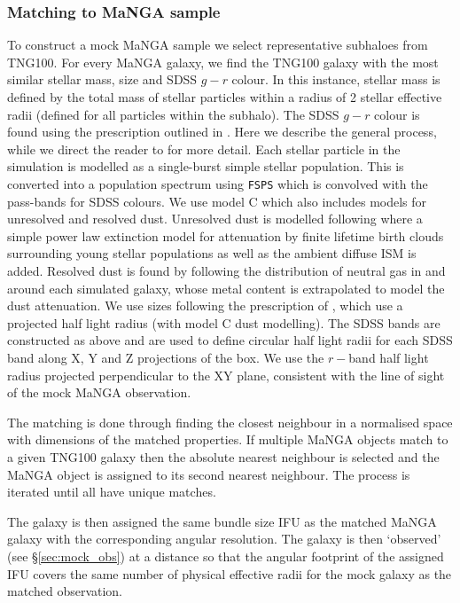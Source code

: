 \subsubsection{Matching to MaNGA sample}
To construct a mock MaNGA sample we select representative subhaloes from TNG100. For every MaNGA galaxy, we find the TNG100 galaxy with the most similar stellar mass, size and SDSS $g - r$ colour. In this instance, stellar mass is defined by the total mass of stellar particles within a radius of 2 stellar effective radii (defined for all particles within the subhalo). The SDSS $g - r$ colour is found using the prescription outlined in \citet{nelson18}. Here we describe the general process, while we direct the reader to \citet{nelson18} for more detail. Each stellar particle in the simulation is modelled as a single-burst simple stellar population. This is converted into a population spectrum using \texttt{FSPS} \citep[Flexible Stellar Population Synthesis;][]{conroy2009,conroy2010,foreman_mackey2014} which is convolved with the pass-bands for SDSS colours. We use model C \citep[as described in][]{nelson18} which also includes models for unresolved and resolved dust. Unresolved dust is modelled following \citet{charlot2000} where a simple power law extinction model for attenuation by finite lifetime birth clouds surrounding young stellar populations as well as the ambient diffuse ISM is added. Resolved dust is found by following the distribution of neutral gas in and around each simulated galaxy, whose metal content is extrapolated to model the dust attenuation. We use sizes following the prescription of \citet{genel2018}, which use a projected half light radius (with model C dust modelling). The SDSS bands are constructed as above and are used to define circular half light radii for each SDSS band along X, Y and Z projections of the box. We use the $r-$band half light radius projected perpendicular to the XY plane, consistent with the line of sight of the mock MaNGA observation.

The matching is done through finding the closest neighbour in a normalised space with dimensions of the matched properties. If multiple MaNGA objects match to a given TNG100 galaxy then the absolute nearest neighbour is selected and the MaNGA object is assigned to its second nearest neighbour. The process is iterated until all have unique matches. 

The galaxy is then assigned the same bundle size IFU as the matched MaNGA galaxy with the corresponding angular resolution. The galaxy is then `observed' (see \S\ref{sec:mock_obs}) at a distance so that the angular footprint of the assigned IFU covers the same number of physical effective radii for the mock galaxy as the matched observation. 

